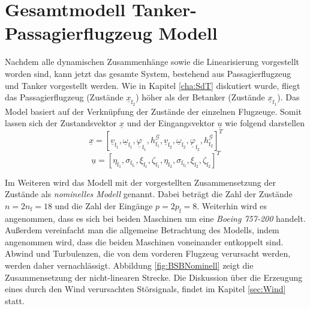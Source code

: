 \chapter{Gesamtmodell Tanker-Passagierflugzeug Modell}\label{cha:ZweiFlieger}
Nachdem alle dynamischen Zusammenhänge sowie die Linearisierung vorgestellt worden sind, kann jetzt das gesamte System, bestehend aus Passagierflugzeug und Tanker vorgestellt werden. Wie in Kapitel \ref{cha:SdT} diskutiert wurde, fliegt das Passagierflugzeug (Zustände $\underline{x}_\mathrm{f_2}$) höher als der Betanker (Zustände $\underline{x}_\mathrm{f_1}$). Das Model basiert auf der Verknüpfung der Zustände der einzelnen Flugzeuge. Somit lassen sich der Zustandsvektor $\underline{x}$ und der Eingangsvektor $\underline{u}$ wie folgend darstellen
\begin{equation}
\underline{x} = [
\underline{v}_\mathrm{f_1},\underline{\omega}_\mathrm{f_1},\underline{\varphi}_\mathrm{f_1},h^\mathcal{G}_\mathrm{f_1},
\underline{v}_\mathrm{f_2},\underline{\omega}_\mathrm{f_2},\underline{\varphi}_\mathrm{f_2},h^\mathcal{G}_\mathrm{f_2}]^T
\end{equation}
\begin{equation}
\underline{u} = [ \eta_\mathrm{f_1},\sigma_{\mathrm{f_{f_1}}}, \xi_\mathrm{f_1} , \zeta_\mathrm{f_1}, \eta_\mathrm{f_2},\sigma_{\mathrm{f_{f_2}}}, \xi_\mathrm{f_2} , \zeta_\mathrm{f_2}]^T
\end{equation}

Im Weiteren wird das Modell mit der vorgestellten Zusammensetzung der Zustände als \textit{nominelles Modell} genannt. Dabei beträgt die Zahl der Zustände $n = 2n_\mathrm{f} = 18$ und die Zahl der Eingänge $p = 2p_\mathrm{f} = 8$. Weiterhin wird es angenommen, dass es sich bei beiden Maschinen um eine \textit{Boeing 757-200} handelt. Au{\ss}erdem vereinfacht man die allgemeine Betrachtung des Modells, indem angenommen wird, dass die beiden Maschinen voneinander entkoppelt sind. Abwind und Turbulenzen, die von dem vorderen Flugzeug verursacht werden, werden daher vernachlässigt. Abbildung \ref{fig:BSBNominell} zeigt die Zusammensetzung der nicht-linearen Strecke. Die Diskussion über die Erzeugung eines durch den Wind verursachten Störsignals, findet im Kapitel \ref{sec:Wind} statt.

